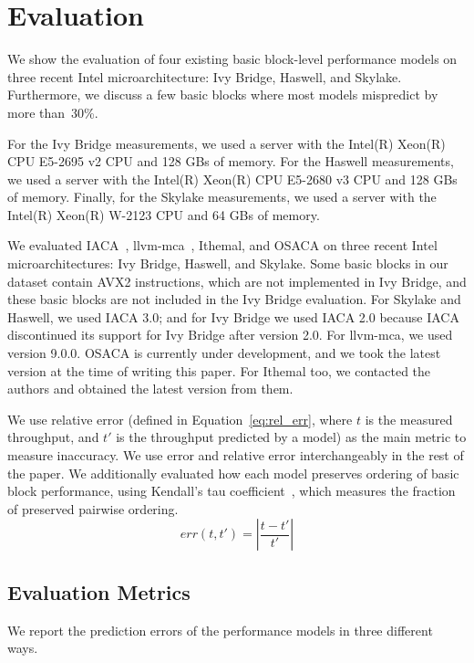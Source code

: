 \section{Evaluation}
We show the evaluation of four existing basic block-level
performance models on three recent Intel microarchitecture:
Ivy Bridge, Haswell, and Skylake. Furthermore, we discuss a few basic blocks where most models
mispredict by more than~30\%.

For the Ivy Bridge measurements,
we used a server with the Intel(R) Xeon(R) CPU E5-2695 v2 CPU and 128 GBs of memory. 
For the Haswell measurements,
we used a server with the Intel(R) Xeon(R) CPU E5-2680 v3 CPU and 128 GBs of memory. 
Finally, for the Skylake measurements, we used a server with the Intel(R) Xeon(R) W-2123 CPU and 64 GBs of memory. 

We evaluated IACA~\cite{iaca}, llvm-mca~\cite{llvm-mca}, Ithemal\cite{ithemal}, and OSACA\cite{osaca}
on three recent Intel microarchitectures: Ivy Bridge, Haswell, and Skylake.
Some basic blocks in our dataset contain AVX2 instructions,
which are not implemented in Ivy Bridge,
and these basic blocks are not included in the Ivy Bridge evaluation.
For Skylake and Haswell, we used IACA 3.0;
and for Ivy Bridge we used IACA 2.0 because IACA discontinued its support for
Ivy Bridge after version 2.0.
For llvm-mca, we used version 9.0.0.
OSACA is currently under development, and we took the latest version
at the time of writing this paper.
For Ithemal too, we contacted the authors and obtained the latest version from them.

We use relative error (defined in Equation~\ref{eq:rel_err}, where $t$ is the measured throughput, and $t'$ is the throughput predicted by a model)
as the main metric to measure inaccuracy.
We use error and relative error interchangeably in the rest of the paper.
We additionally evaluated how each model preserves ordering of basic block performance,
using Kendall's tau coefficient~\cite{kendalltau},
which measures the fraction of preserved pairwise ordering.
\begin{equation}
\mathit{err}(t, t') = \left| \frac{t - t'}{t'} \right| 
\label{eq:rel_err}
\end{equation}

\subsection{Evaluation Metrics}\label{results}
We report the prediction errors of the performance models in three different ways.

